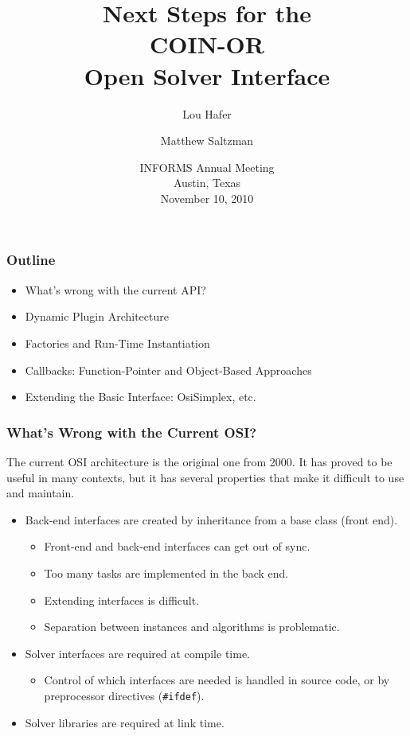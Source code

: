 \documentclass{beamer}
\title{Next Steps for the  \\ COIN-OR \\ Open Solver Interface}
\author{Lou Hafer\inst{1} \and Matthew Saltzman\inst{2}}
\institute{
  \inst{1}
  Department of Computer Science \\
  Simon Fraser University
  \and
  \inst{2}
  Department of Mathematical Sciences \\
  Clemson University.
}
\date{INFORMS Annual Meeting \\ Austin, Texas \\ November 10, 2010}
\begin{document}
\begin{frame}
  \titlepage
\end{frame}

\begin{frame}
  \frametitle{Outline}

  \begin{itemize}
  \item What's wrong with the current API?
  \item Dynamic Plugin Architecture
  \item Factories and Run-Time Instantiation
  \item Callbacks: Function-Pointer and Object-Based Approaches
  \item Extending the Basic Interface: OsiSimplex, etc.
  \end{itemize}
\end{frame}

\begin{frame}
  \frametitle{What's Wrong with the Current OSI?}

  The current OSI architecture is the original one from 2000.  It
  has proved to be useful in many contexts, but it has several
  properties that make it difficult to use and maintain.
  \begin{itemize}
  \item Back-end interfaces are created by inheritance from a base
    class (front end).
    \begin{itemize}
    \item Front-end and back-end interfaces can get out of sync.
    \item Too many tasks are implemented in the back end.
    \item Extending interfaces is difficult.
    \item Separation between instances and algorithms is problematic.
    \end{itemize}
  \item Solver interfaces are required at compile time.
    \begin{itemize}
    \item Control of which interfaces are needed is handled in
      source code, or by preprocessor directives (\texttt{\#ifdef}).
    \end{itemize}
  \item Solver libraries are required at link time.
  \end{itemize}
\end{frame}
\end{document}
